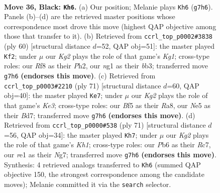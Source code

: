 \documentclass[11pt]{article}
\begin{document}
\clearpage

\begin{figure}[p]\centering
\begin{subfigure}{0.46\textwidth}\centering
\resizebox{\linewidth}{!}{%
\newchessgame
\chessboard[
  setfen={5r2/4r1k1/1p6/p1p1nb2/P5p1/2P5/K5PP/2N1RBNR b - - 1 36},
  showmover=false,
  pgfstyle=straightmove, color=movearrow, markmove={g7-h6}
]}
\caption{}
\end{subfigure}\hfill
\begin{subfigure}{0.46\textwidth}\centering
\resizebox{\linewidth}{!}{%
\newchessgame
\chessboard[
  setfen={8/1pr1kppp/1n6/p5P1/5P2/PbN1PB2/7P/2R3K1 w - - 3 31},
  showmover=false,
  pgfstyle=straightmove, color=movearrow, markmove={g1-f2}
]}
\caption{}
\end{subfigure}
\\[4pt]
\begin{subfigure}{0.46\textwidth}\centering
\resizebox{\linewidth}{!}{%
\newchessgame
\chessboard[
  setfen={r2r4/1p1b3p/4k1p1/1P3p2/4p2P/4P3/3RNPP1/1R4K1 b - - 4 36},
  showmover=false,
  pgfstyle=straightmove, color=movearrow, markmove={e6-e7}
]}
\caption{}
\end{subfigure}\hfill
\begin{subfigure}{0.46\textwidth}\centering
\resizebox{\linewidth}{!}{%
\newchessgame
\chessboard[
  setfen={3r3k/2r2pn1/pp5p/2p1PP2/P2p3N/7P/1PPR1K2/5R2 b - - 2 36},
  showmover=false,
  pgfstyle=straightmove, color=movearrow, markmove={h8-h7}
]}
\caption{}
\end{subfigure}
\caption{\textbf{Move 36, Black: \texttt{Kh6}.} (a) Our position; Melanie plays \texttt{Kh6} (\texttt{g7h6}). Panels (b)--(d) are the retrieved master positions whose correspondence most drove this move (highest QAP objective among those that transfer to it). (b) Retrieved from \texttt{ccrl\_top\_p0002\#3838} (ply 60) [structural distance $d$=52, QAP obj=51]: the master played \texttt{Kf2}; under $\mu$ our \emph{Kg2} plays the role of that game's \emph{Kg1}; cross-type roles: our \emph{R}f8 as their \emph{P}h2, our \emph{n}g1 as their \emph{b}b3; transferred move \texttt{g7h6} \textbf{(endorses this move)}. (c) Retrieved from \texttt{ccrl\_top\_p0003\#2210} (ply 71) [structural distance $d$=60, QAP obj=40]: the master played \texttt{Ke7}; under $\mu$ our \emph{Kg2} plays the role of that game's \emph{Ke3}; cross-type roles: our \emph{B}f5 as their \emph{R}a8, our \emph{N}e5 as their \emph{B}d7; transferred move \texttt{g7h6} \textbf{(endorses this move)}. (d) Retrieved from \texttt{ccrl\_top\_p0000\#538} (ply 71) [structural distance $d$=56, QAP obj=34]: the master played \texttt{Kh7}; under $\mu$ our \emph{Kg2} plays the role of that game's \emph{Kh1}; cross-type roles: our \emph{P}b6 as their \emph{R}c7, our \emph{r}e1 as their \emph{N}g7; transferred move \texttt{g7h6} \textbf{(endorses this move)}. Synthesis: 4 retrieved analogs transferred to \texttt{Kh6} (summed QAP objective 150, the strongest correspondence among the candidate moves); Melanie committed it via the \texttt{search} selector.}
\label{fig:thought-m71}
\end{figure}
\end{document}

